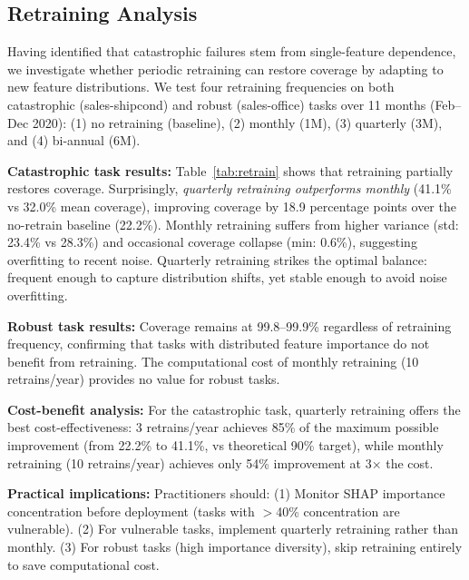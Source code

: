 
\subsection{Retraining Analysis}

Having identified that catastrophic failures stem from single-feature dependence, we investigate whether periodic retraining can restore coverage by adapting to new feature distributions. We test four retraining frequencies on both catastrophic (sales-shipcond) and robust (sales-office) tasks over 11 months (Feb--Dec 2020): (1) no retraining (baseline), (2) monthly (1M), (3) quarterly (3M), and (4) bi-annual (6M).

\textbf{Catastrophic task results:} Table~\ref{tab:retrain} shows that retraining partially restores coverage. Surprisingly, \emph{quarterly retraining outperforms monthly} (41.1\% vs 32.0\% mean coverage), improving coverage by 18.9 percentage points over the no-retrain baseline (22.2\%). Monthly retraining suffers from higher variance (std: 23.4\% vs 28.3\%) and occasional coverage collapse (min: 0.6\%), suggesting overfitting to recent noise. Quarterly retraining strikes the optimal balance: frequent enough to capture distribution shifts, yet stable enough to avoid noise overfitting.

\textbf{Robust task results:} Coverage remains at 99.8--99.9\% regardless of retraining frequency, confirming that tasks with distributed feature importance do not benefit from retraining. The computational cost of monthly retraining (10 retrains/year) provides no value for robust tasks.

\textbf{Cost-benefit analysis:} For the catastrophic task, quarterly retraining offers the best cost-effectiveness: 3 retrains/year achieves 85\% of the maximum possible improvement (from 22.2\% to 41.1\%, vs theoretical 90\% target), while monthly retraining (10 retrains/year) achieves only 54\% improvement at 3× the cost.

\textbf{Practical implications:} Practitioners should:
(1) Monitor SHAP importance concentration before deployment (tasks with $>$40\% concentration are vulnerable).
(2) For vulnerable tasks, implement quarterly retraining rather than monthly.
(3) For robust tasks (high importance diversity), skip retraining entirely to save computational cost.

